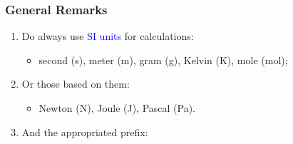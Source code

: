 \documentclass[10pt,compress]{beamer}
\begin{document}
\begin{frame}
 \frametitle{General Remarks}
  \begin{enumerate}
   \item <1-> Do always use \textcolor{blue}{SI units} for calculations:
     \begin{itemize}
       \item<1-> second (s), meter (m), gram (g), Kelvin (K), mole (mol);
     \end{itemize}
   \item<2-> Or those based on them:
     \begin{itemize}
       \item<2-> Newton (N), Joule (J), Pascal (Pa).
     \end{itemize}
   \item<3->  And the appropriated prefix:
  \begin{center}
  \end{center}
  \end{enumerate}

\end{frame}
\end{document}
